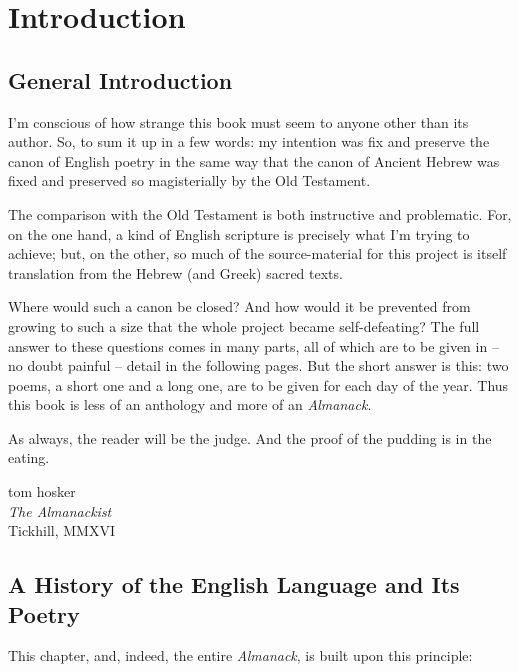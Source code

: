 \documentclass[0main.tex]{subfiles}
\begin{document}
\part*{Introduction}

\chapter*{General Introduction}
\renewcommand*{\theHsection}{ch1.\the\value{section}}

I'm conscious of how strange this book must seem to anyone other than its author. So, to sum it up in a few words: my intention was fix and preserve the canon of English poetry in the same way that the canon of Ancient Hebrew was fixed and preserved so magisterially by the Old Testament.

The comparison with the Old Testament is both instructive and problematic. For, on the one hand, a kind of English scripture is precisely what I'm trying to achieve; but, on the other, so much of the source-material for this project is itself translation from the Hebrew (and Greek) sacred texts.

Where would such a canon be closed? And how would it be prevented from growing to such a size that the whole project became self-defeating? The full answer to these questions comes in many parts, all of which are to be given in -- no doubt painful -- detail in the following pages. But the short answer is this: two poems, a short one and a long one, are to be given for each day of the year. Thus this book is less of an anthology and more of an \emph{Almanack}.

As always, the reader will be the judge. And the proof of the pudding is in the eating.

\bigskip

\begin{flushright}
{\sc tom hosker} \\
\emph{The Almanackist} \\
Tickhill, MMXVI
\end{flushright}

\chapter*{A History of the English Language and Its Poetry}
\renewcommand*{\theHsection}{ch2.\the\value{section}}

This chapter, and, indeed, the entire \emph{Almanack}, is built upon this principle:
\end{document}
